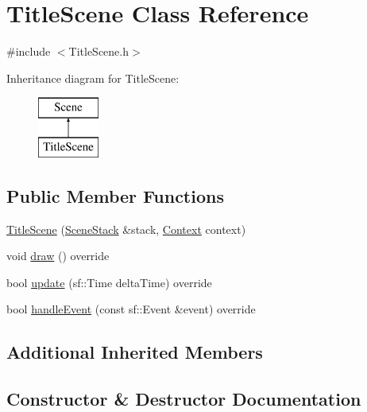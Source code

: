 \hypertarget{class_title_scene}{}\section{Title\+Scene Class Reference}
\label{class_title_scene}


{\ttfamily \#include $<$Title\+Scene.\+h$>$}

Inheritance diagram for Title\+Scene\+:\begin{figure}[H]
\begin{center}
\leavevmode
\includegraphics[height=2.000000cm]{class_title_scene}
\end{center}
\end{figure}
\subsection*{Public Member Functions}
\begin{DoxyCompactItemize}
\item 
\hyperlink{class_title_scene_a280a3b1e5890f45b932860777f8fbe6d}{Title\+Scene} (\hyperlink{class_scene_stack}{Scene\+Stack} \&stack, \hyperlink{struct_scene_1_1_context}{Context} context)
\item 
void \hyperlink{class_title_scene_a3e527255771f75a41c4fe8aaa35999dd}{draw} () override
\item 
bool \hyperlink{class_title_scene_a17ce1b5b9f6f8ca44a6ed3326e9e5d0a}{update} (sf\+::\+Time delta\+Time) override
\item 
bool \hyperlink{class_title_scene_a1f019a83309ce967883b4b4d76b816af}{handle\+Event} (const sf\+::\+Event \&event) override
\end{DoxyCompactItemize}
\subsection*{Additional Inherited Members}


\subsection{Constructor \& Destructor Documentation}
\mbox{\label{class_title_scene_a280a3b1e5890f45b932860777f8fbe6d}} 

